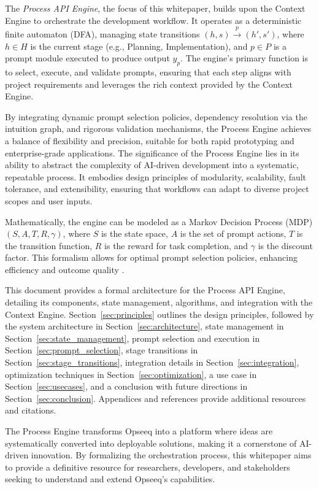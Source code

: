 \documentclass[11pt,a4paper]{article}
\begin{document}
The \emph{Process API Engine}, the focus of this whitepaper, builds upon the Context Engine to orchestrate the development workflow. It operates as a deterministic finite automaton (DFA), managing state transitions \( (h, s) \xrightarrow{p} (h', s') \), where \( h \in H \) is the current stage (e.g., Planning, Implementation), and \( p \in P \) is a prompt module executed to produce output \( y_p \). The engine’s primary function is to select, execute, and validate prompts, ensuring that each step aligns with project requirements and leverages the rich context provided by the Context Engine.

By integrating dynamic prompt selection policies, dependency resolution via the intuition graph, and rigorous validation mechanisms, the Process Engine achieves a balance of flexibility and precision, suitable for both rapid prototyping and enterprise-grade applications. The significance of the Process Engine lies in its ability to abstract the complexity of AI-driven development into a systematic, repeatable process. It embodies design principles of modularity, scalability, fault tolerance, and extensibility, ensuring that workflows can adapt to diverse project scopes and user inputs.

Mathematically, the engine can be modeled as a Markov Decision Process (MDP) \( (S, A, T, R, \gamma) \), where \( S \) is the state space, \( A \) is the set of prompt actions, \( T \) is the transition function, \( R \) is the reward for task completion, and \( \gamma \) is the discount factor. This formalism allows for optimal prompt selection policies, enhancing efficiency and outcome quality \cite{bellman1957}.

This document provides a formal architecture for the Process API Engine, detailing its components, state management, algorithms, and integration with the Context Engine. Section~\ref{sec:principles} outlines the design principles, followed by the system architecture in Section~\ref{sec:architecture}, state management in Section~\ref{sec:state_management}, prompt selection and execution in Section~\ref{sec:prompt_selection}, stage transitions in Section~\ref{sec:stage_transitions}, integration details in Section~\ref{sec:integration}, optimization techniques in Section~\ref{sec:optimization}, a use case in Section~\ref{sec:usecases}, and a conclusion with future directions in Section~\ref{sec:conclusion}. Appendices and references provide additional resources and citations.

The Process Engine transforms Opseeq into a platform where ideas are systematically converted into deployable solutions, making it a cornerstone of AI-driven innovation. By formalizing the orchestration process, this whitepaper aims to provide a definitive resource for researchers, developers, and stakeholders seeking to understand and extend Opseeq’s capabilities.
\end{document}
